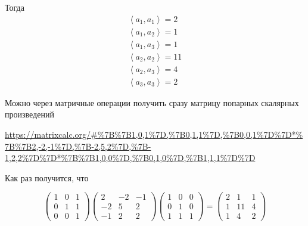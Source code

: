 \documentclass[12pt, a4paper]{article}
\begin{document}
    Тогда
    \begin{gather*}
        \left\langle a_1, a_1 \right\rangle = 2 \\
        \left\langle a_1, a_2 \right\rangle = 1 \\
        \left\langle a_1, a_3 \right\rangle = 1 \\
        \left\langle a_2, a_2 \right\rangle = 11 \\
        \left\langle a_2, a_3 \right\rangle = 4 \\
        \left\langle a_3, a_3 \right\rangle = 2
    \end{gather*}

    Можно через матричные операции получить сразу матрицу попарных скалярных произведений

    \url{https://matrixcalc.org/#%7B%7B1,0,1%7D,%7B0,1,1%7D,%7B0,0,1%7D%7D*%7B%7B2,-2,-1%7D,%7B-2,5,2%7D,%7B-1,2,2%7D%7D*%7B%7B1,0,0%7D,%7B0,1,0%7D,%7B1,1,1%7D%7D}


    Как раз получится, что 

    \begin{equation}
        \left(\begin{matrix}
            1 & 0 & 1 \\
            0 & 1 & 1 \\
            0 & 0 & 1
        \end{matrix}\right)\left(\begin{matrix}
            2 & -2 & -1 \\
            -2 & 5 & 2 \\
            -1 & 2 & 2
        \end{matrix}\right)\left(\begin{matrix}
            1 & 0 & 0 \\
            0 & 1 & 0 \\
            1 & 1 & 1
        \end{matrix}\right) = \left(\begin{matrix}
            2 & 1 & 1 \\
            1 & 11 & 4 \\
            1 & 4 & 2
        \end{matrix}\right)
    \end{equation}
\end{document}
